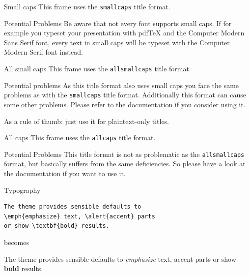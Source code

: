 \documentclass[10pt,spanish]{beamer}
\begin{document}
{
\begin{frame}{Small caps}
This frame uses the \texttt{smallcaps} title format.

\begin{alertblock}{Potential Problems}
Be aware that not every font supports small caps. If for example you typeset your presentation with pdfTeX and the Computer Modern Sans Serif font, every text in small caps will be typeset with the Computer Modern Serif font instead.
\end{alertblock}
\end{frame}
}

{
\begin{frame}{All small caps}
This frame uses the \texttt{allsmallcaps} title format.

\begin{alertblock}{Potential problems}
As this title format also uses small caps you face the same problems as with the \texttt{smallcaps} title format. Additionally this format can cause some other problems. Please refer to the documentation if you consider using it.

As a rule of thumb: just use it for plaintext-only titles.
\end{alertblock}
\end{frame}
}

{
\begin{frame}{All caps}
This frame uses the \texttt{allcaps} title format.

\begin{alertblock}{Potential Problems}
This title format is not as problematic as the \texttt{allsmallcaps} format, but basically suffers from the same deficiencies. So please have a look at the documentation if you want to use it.
\end{alertblock}
\end{frame}
}


\begin{frame}[fragile]{Typography}
\begin{verbatim}The theme provides sensible defaults to
\emph{emphasize} text, \alert{accent} parts
or show \textbf{bold} results.\end{verbatim}

\begin{center}becomes\end{center}

The theme provides sensible defaults to \emph{emphasize} text,
\alert{accent} parts or show \textbf{bold} results.
\end{frame}
\end{document}
